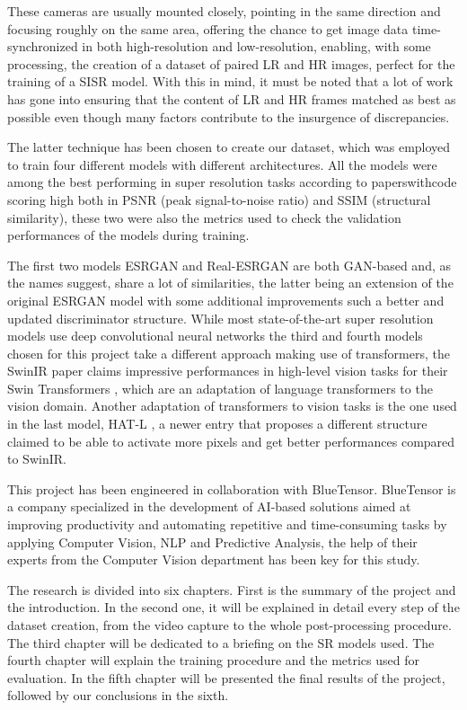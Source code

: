 These cameras are usually mounted closely, pointing in the same direction and focusing roughly on the same area, offering the chance to get image data time-synchronized in both high-resolution and low-resolution, enabling, with some processing, the creation of a dataset of paired LR and HR images, perfect for the training of a SISR model. With this in mind, it must be noted that a lot of work has gone into ensuring that the content of LR and HR frames matched as best as possible even though many factors contribute to the insurgence of discrepancies.

The latter technique has been chosen to create our dataset, which was employed to train four different models with different architectures. All the models were among the best performing in super resolution tasks according to paperswithcode \cite{pwcode} scoring high both in PSNR \cite{psnr} (peak signal-to-noise ratio) and SSIM \cite{ssim} (structural similarity), these two were also the metrics used to check the validation performances of the models during training.

The first two models ESRGAN \cite{wang2018esrgan} and Real-ESRGAN \cite{wang2021realesrgan} are both GAN-based and, as the names suggest, share a lot of similarities, the latter being an extension of the original ESRGAN model with some additional improvements such a better and updated discriminator structure. While most state-of-the-art super resolution models use deep convolutional neural networks the third and fourth models chosen for this project take a different approach making use of transformers, the SwinIR \cite{liang2021swinir} paper claims impressive performances in high-level vision tasks for their Swin Transformers \cite{liu2021swin}, which are an adaptation of language transformers to the vision domain. Another adaptation of transformers to vision tasks is the one used in the last model, HAT-L \cite{chen2023activating}, a newer entry that proposes a different structure claimed to be able to activate more pixels and get better performances compared to SwinIR.

This project has been engineered in collaboration with BlueTensor. BlueTensor is a company specialized in the development of AI-based solutions aimed at improving productivity and automating repetitive and time-consuming tasks by applying Computer Vision, NLP and Predictive Analysis, the help of their experts from the Computer Vision department has been key for this study.

The research is divided into six chapters. First is the summary of the project and the introduction. In the second one, it will be explained in detail every step of the dataset creation, from the video capture to the whole post-processing procedure. The third chapter will be dedicated to a briefing on the SR models used. The fourth chapter will explain the training procedure and the metrics used for evaluation. In the fifth chapter will be presented the final results of the project, followed by our conclusions in the sixth.

